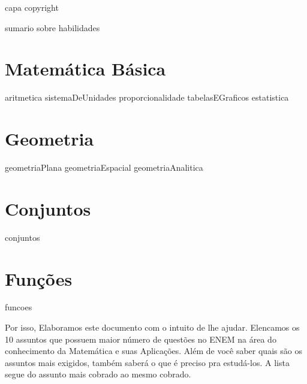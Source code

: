 \documentclass[11pt,fleqn]{book}
\begin{document}
{capa} %
{copyright} %

{sumario} %
{sobre} %
{habilidades} %

\part{Matemática Básica}
{aritmetica}
{sistemaDeUnidades}
{proporcionalidade}
{tabelasEGraficos}
{estatistica}

\part{Geometria}
{geometriaPlana}
{geometriaEspacial}
{geometriaAnalitica}

\part{Conjuntos}
{conjuntos}

\part{Funções}
{funcoes}
\begin{corollary}
Por isso, Elaboramos este documento com o intuito de lhe ajudar. Elencamos os 10 assuntos que possuem maior número de questões no ENEM na área do conhecimento da Matemática e suas Aplicações. Além de você saber quais são os assuntos mais exigidos, também saberá o que é preciso pra estudá-los. A lista segue do assunto mais cobrado ao mesmo cobrado.
\end{corollary}
\end{document}
